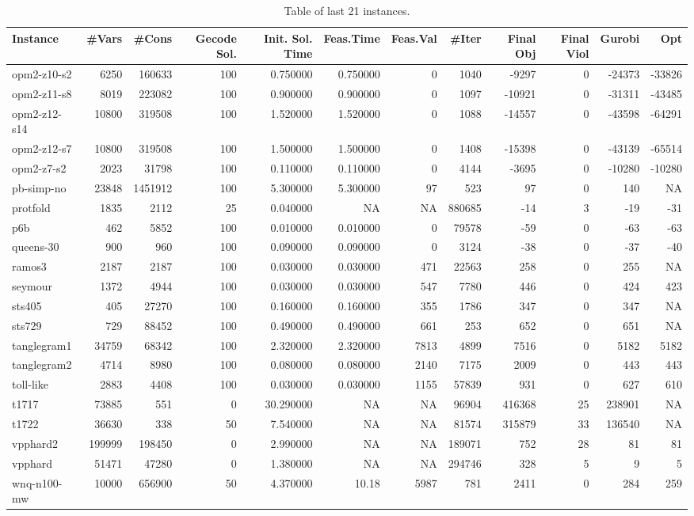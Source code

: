 \begin{sidewaystable}
\begin{tabular}{|l|r|r|r|r|r|r|r|r|r|r|r|}
\hline
Instance    & \#Vars & \#Cons & Gecode Sol. & Init. Sol. Time & Feas.Time & Feas.Val & 
\#Iter & Final Obj & Final Viol & Gurobi & Opt \\ \hline
opm2-z10-s2 & 6250 & 160633 & 100 & 0.750000 & 0.750000 & 0 & 1040 & -9297 & 0 & -24373 & -33826\\ \hline 
opm2-z11-s8 & 8019 & 223082 & 100 & 0.900000 & 0.900000 & 0 & 1097 & -10921 & 0 & -31311 & -43485\\ \hline 
opm2-z12-s14 & 10800 & 319508 & 100 & 1.520000 & 1.520000 & 0 & 1088 & -14557 & 0 & -43598 & -64291\\ \hline 
opm2-z12-s7 & 10800 & 319508 & 100 & 1.500000 & 1.500000 & 0 & 1408 & -15398 & 0 & -43139 & -65514\\ \hline 
opm2-z7-s2 & 2023 & 31798 & 100 & 0.110000 & 0.110000 & 0 & 4144 & -3695 & 0 & -10280 & -10280\\ \hline 
pb-simp-no & 23848 & 1451912 & 100 & 5.300000 & 5.300000 & 97 & 523 & 97 & 0 & 140 & NA\\ \hline 
protfold & 1835 & 2112 & 25 & 0.040000 & NA & NA & 880685 & -14 & 3 & -19 & -31\\ \hline 
p6b & 462 & 5852 & 100 & 0.010000 & 0.010000 & 0 & 79578 & -59 & 0 & -63 & -63\\ \hline 
queens-30 & 900 & 960 & 100 & 0.090000 & 0.090000 & 0 & 3124 & -38 & 0 & -37 & -40\\ \hline 
ramos3 & 2187 & 2187 & 100 & 0.030000 & 0.030000 & 471 & 22563 & 258 & 0 & 255 & NA\\ \hline 
seymour & 1372 & 4944 & 100 & 0.030000 & 0.030000 & 547 & 7780 & 446 & 0 & 424 & 423\\ \hline 
sts405 & 405 & 27270 & 100 & 0.160000 & 0.160000 & 355 & 1786 & 347 & 0 & 347 & NA\\ \hline 
sts729 & 729 & 88452 & 100 & 0.490000 & 0.490000 & 661 & 253 & 652 & 0 & 651 & NA\\ \hline 
tanglegram1 & 34759 & 68342 & 100 & 2.320000 & 2.320000 & 7813 & 4899 & 7516 & 0 & 5182 & 5182\\ \hline 
tanglegram2 & 4714 & 8980 & 100 & 0.080000 & 0.080000 & 2140 & 7175 & 2009 & 0 & 443 & 443\\ \hline 
toll-like & 2883 & 4408 & 100 & 0.030000 & 0.030000 & 1155 & 57839 & 931 & 0 & 627 & 610  \\ \hline 
t1717 & 73885 & 551 & 0 & 30.290000 & NA & NA & 96904 & 416368 & 25 & 238901 & NA \\ \hline 
t1722 & 36630 & 338 & 50 & 7.540000 & NA & NA & 81574 & 315879 & 33 & 136540 & NA\\ \hline 
vpphard2 & 199999 & 198450 & 0 & 2.990000 & NA & NA & 189071 & 752 & 28 & 81 & 81\\ \hline 
vpphard & 51471 & 47280 & 0 & 1.380000 & NA & NA & 294746 & 328 & 5 & 9 & 5\\ \hline 
wnq-n100-mw & 10000 & 656900 & 50 & 4.370000 & 10.18 & 5987 & 781 & 2411 & 0 & 284 & 259 \\ \hline
\end{tabular}
\caption{Table of last 21 instances.}
\label{tab3}
\end{sidewaystable}


\newpage

